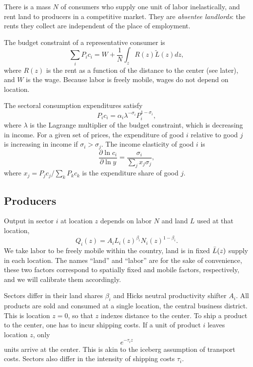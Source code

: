 \documentclass[12pt]{article}
\begin{document}
There is a mass $N$ of consumers who supply one unit of labor inelastically, and rent land to producers in a competitive market. They are \emph{absentee landlords}: the rents they collect are independent of the place of employment.

The budget constraint of a representative consumer is
\begin{equation}
\label{eq:BudCons}
\sum_i P_i c_i
	= W
	+ \frac 1N \int_z R(z)\tilde{L}(z)dz,
\end{equation}
where $R(z)$ is the rent as a function of the distance to the center (see later), and $W$ is the wage. Because labor is freely mobile, wages do not depend on location.

The sectoral consumption expenditures satisfy
\begin{equation}\label{eq:ConsShares}
{P_i c_i}
=
\alpha_i
\lambda^{ - \sigma_i}
{ P_i^{1-\sigma_i}},
\end{equation}
where $\lambda$ is the Lagrange multiplier of the budget constraint, which is decreasing in income. For a given set of prices, the expenditure of good $i$ relative to good $j$ is increasing in income if $\sigma_i>\sigma_j$.
The income elasticity of good $i$ is
\begin{equation}\label{eq:income_elasticity}
\frac 	{\partial \ln c_i}
		{\partial \ln y}
=
\frac 	{\sigma_i}
		{\sum_j x_j\sigma_j},
\end{equation}
where $x_j=P_jc_j/\sum_k P_kc_k$ is the expenditure share of good $j$.


\subsection{Producers}
Output in sector $i$ at location $z$ depends on labor $N$ and land $L$ used at that location,
\[
Q_i(z) = A_i L_i(z)^{\beta_i}N_i(z)^{1-\beta_i}.
\]
We take labor to be freely mobile within the country, land is in fixed $\Bar{L}(z)$ supply in each location. The names ``land'' and ``labor'' are for the sake of convenience, these two factors correspond to spatially fixed and mobile factors, respectively, and we will calibrate them accordingly.

Sectors differ in their land shares $\beta_i$ and Hicks neutral productivity shifter $A_i$.
All products are sold and consumed at a single location, the central business district. This is location $z=0$, so that $z$ indexes distance to the center.
To ship a product to the center, one has to incur shipping costs. If a unit of product $i$ leaves location $z$, only
\[
e^{-\tau_i z}
\]
units arrive at the center. This is akin to the iceberg assumption of transport costs. Sectors also differ in the intensity of shipping costs $\tau_i$.
\end{document}
